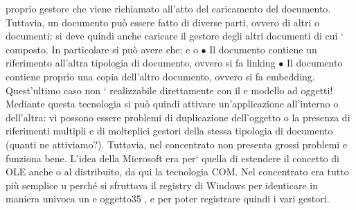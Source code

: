 \documentclass[a4paper,12pt]{article}
\begin{document}
proprio gestore che viene richiamato all'atto del caricamento del documento.
Tuttavia, un documento può essere fatto di diverse parti, ovvero di altri
o
documenti: si deve quindi anche caricare il gestore degli altri documenti di cui
` composto. In particolare si può avere che:
e
o
$\bullet$ Il documento contiene un riferimento all'altra tipologia di documento,
ovvero si fa linking
$\bullet$ Il documento contiene proprio una copia dell'altro documento, ovvero si
fa embedding. Quest'ultimo caso non ` realizzabile direttamente con il
e
modello ad oggetti!
Mediante questa tecnologia si può quindi attivare un'applicazione all'interno
o
dell'altra: vi possono essere problemi di duplicazione dell'oggetto o la presenza
di riferimenti multipli e di molteplici gestori della stessa tipologia di documento
(quanti ne attiviamo?). Tuttavia, nel concentrato non presenta grossi problemi
e funziona bene.
L'idea della Microsoft era per` quella di estendere il concetto di OLE anche
o
al distribuito, da qui la tecnologia COM. Nel concentrato era tutto più semplice
u
perché si sfruttava il registry di Windows per identicare in maniera univoca un
e
oggetto35 , e per poter registrare quindi i vari gestori.
\end{document}
